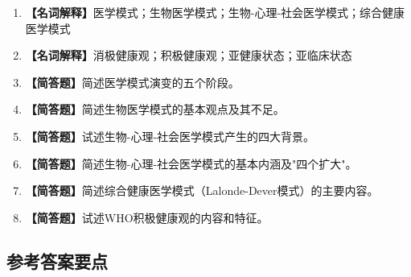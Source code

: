 \begin{enumerate}[leftmargin=*, itemsep=8pt]
    \item \textbf{【名词解释】}医学模式；生物医学模式；生物-心理-社会医学模式；综合健康医学模式
    \item \textbf{【名词解释】}消极健康观；积极健康观；亚健康状态；亚临床状态
    \item \textbf{【简答题】}简述医学模式演变的五个阶段。
    \item \textbf{【简答题】}简述生物医学模式的基本观点及其不足。
    \item \textbf{【简答题】}试述生物-心理-社会医学模式产生的四大背景。
    \item \textbf{【简答题】}简述生物-心理-社会医学模式的基本内涵及"四个扩大"。
    \item \textbf{【简答题】}简述综合健康医学模式（Lalonde-Dever模式）的主要内容。
    \item \textbf{【简答题】}试述WHO积极健康观的内容和特征。
\end{enumerate}

\subsection*{参考答案要点}

